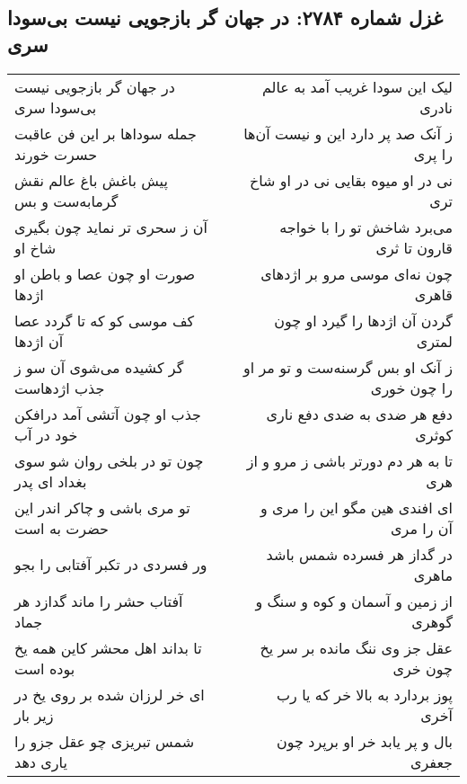 \begin{center}
\section*{غزل شماره ۲۷۸۴: در جهان گر بازجویی نیست بی‌سودا سری}
\label{sec:2784}
\begin{longtable}{l p{0.5cm} r}
در جهان گر بازجویی نیست بی‌سودا سری
&&
لیک این سودا غریب آمد به عالم نادری
\\
جمله سوداها بر این فن عاقبت حسرت خورند
&&
ز آنک صد پر دارد این و نیست آن‌ها را پری
\\
پیش باغش باغ عالم نقش گرمابه‌ست و بس
&&
نی در او میوه بقایی نی در او شاخ تری
\\
آن ز سحری تر نماید چون بگیری شاخ او
&&
می‌برد شاخش تو را با خواجه قارون تا ثری
\\
صورت او چون عصا و باطن او اژدها
&&
چون نه‌ای موسی مرو بر اژدهای قاهری
\\
کف موسی کو که تا گردد عصا آن اژدها
&&
گردن آن اژدها را گیرد او چون لمتری
\\
گر کشیده می‌شوی آن سو ز جذب اژدهاست
&&
ز آنک او بس گرسنه‌ست و تو مر او را چون خوری
\\
جذب او چون آتشی آمد درافکن خود در آب
&&
دفع هر ضدی به ضدی دفع ناری کوثری
\\
چون تو در بلخی روان شو سوی بغداد ای پدر
&&
تا به هر دم دورتر باشی ز مرو و از هری
\\
تو مری باشی و چاکر اندر این حضرت به است
&&
ای افندی هین مگو این را مری و آن را مری
\\
ور فسردی در تکبر آفتابی را بجو
&&
در گداز هر فسرده شمس باشد ماهری
\\
آفتاب حشر را ماند گدازد هر جماد
&&
از زمین و آسمان و کوه و سنگ و گوهری
\\
تا بداند اهل محشر کاین همه یخ بوده است
&&
عقل جز وی ننگ مانده بر سر یخ چون خری
\\
ای خر لرزان شده بر روی یخ در زیر بار
&&
پوز بردارد به بالا خر که یا رب آخری
\\
شمس تبریزی چو عقل جزو را یاری دهد
&&
بال و پر یابد خر او برپرد چون جعفری
\\
\end{longtable}
\end{center}

